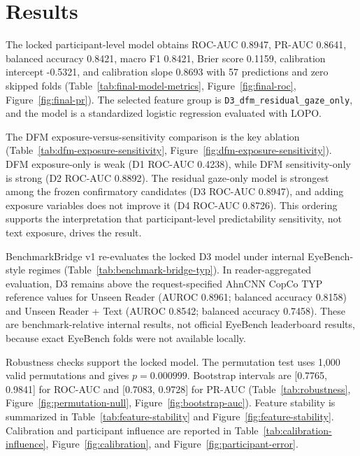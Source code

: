 \section{Results}
The locked participant-level model obtains ROC-AUC 0.8947, PR-AUC 0.8641, balanced accuracy 0.8421, macro F1 0.8421, Brier score 0.1159, calibration intercept -0.5321, and calibration slope 0.8693 with 57 predictions and zero
skipped folds (Table~\ref{tab:final-model-metrics}, Figure~\ref{fig:final-roc},
Figure~\ref{fig:final-pr}). The selected feature group is
\texttt{D3\_dfm\_residual\_gaze\_only}, and the model is a standardized logistic
regression evaluated with LOPO.

The DFM exposure-versus-sensitivity comparison is the key ablation
(Table~\ref{tab:dfm-exposure-sensitivity}, Figure~\ref{fig:dfm-exposure-sensitivity}).
DFM exposure-only is weak (D1 ROC-AUC 0.4238), while DFM sensitivity-only is strong
(D2 ROC-AUC 0.8892). The residual gaze-only model is strongest among the frozen
confirmatory candidates (D3 ROC-AUC 0.8947), and adding exposure variables does not
improve it (D4 ROC-AUC 0.8726). This ordering supports the interpretation that
participant-level predictability sensitivity, not text exposure, drives the result.

BenchmarkBridge v1 re-evaluates the locked D3 model under internal EyeBench-style
regimes (Table~\ref{tab:benchmark-bridge-typ}). In reader-aggregated evaluation, D3
remains above the request-specified AhnCNN CopCo TYP reference values for Unseen Reader
(AUROC 0.8961; balanced accuracy 0.8158) and Unseen Reader + Text (AUROC 0.8542;
balanced accuracy 0.7458). These are benchmark-relative internal results, not official
EyeBench leaderboard results, because exact EyeBench folds were not available locally.

Robustness checks support the locked model. The permutation test uses 1,000 valid
permutations and gives $p=0.000999$. Bootstrap intervals are [0.7765, 0.9841] for
ROC-AUC and [0.7083, 0.9728] for PR-AUC (Table~\ref{tab:robustness},
Figure~\ref{fig:permutation-null}, Figure~\ref{fig:bootstrap-auc}). Feature
stability is summarized in Table~\ref{tab:feature-stability} and
Figure~\ref{fig:feature-stability}. Calibration and participant influence are
reported in Table~\ref{tab:calibration-influence}, Figure~\ref{fig:calibration},
and Figure~\ref{fig:participant-error}.







